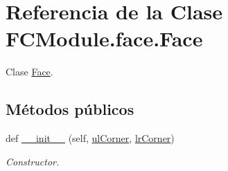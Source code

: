 \hypertarget{class_f_c_module_1_1face_1_1_face}{}\section{Referencia de la Clase F\+C\+Module.\+face.\+Face}
\label{class_f_c_module_1_1face_1_1_face}


Clase \mbox{\hyperlink{class_f_c_module_1_1face_1_1_face}{Face}}.  


\subsection*{Métodos públicos}
\begin{DoxyCompactItemize}
\item 
def \mbox{\hyperlink{class_f_c_module_1_1face_1_1_face_a5ff0ae73e73bc15b7c92d45f339cd25f}{\+\_\+\+\_\+init\+\_\+\+\_\+}} (self, \mbox{\hyperlink{class_f_c_module_1_1face_1_1_face_a23e2d922b8ff5921a8c776d0a2f2f61a}{ul\+Corner}}, \mbox{\hyperlink{class_f_c_module_1_1face_1_1_face_a43bf5b7efff377dfe7d6a3e25a58c0cc}{lr\+Corner}})
\begin{DoxyCompactList}\small\item\em Constructor. \end{DoxyCompactList}\end{DoxyCompactItemize}
